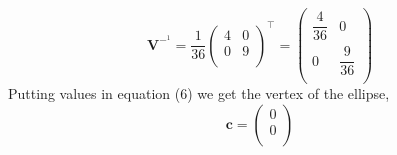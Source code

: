 \documentclass[twocolumn]{article}
\begin{document}
\begin{equation}
\textbf{V}^-^1 = \frac{1}{36} \begin{pmatrix}
4 & 0\\
0 & 9\\
\end{pmatrix}^\top 
 = \begin{pmatrix}
\dfrac{4}{36} & 0\\
0 & \dfrac{9}{36}\\
\end{pmatrix}
\end{equation}
Putting values in equation (6) we get the vertex of the ellipse,
\begin{equation}
\textbf{c} = \begin{pmatrix}
0\\
0\\
\end{pmatrix} 
\end{equation}
\end{document}
